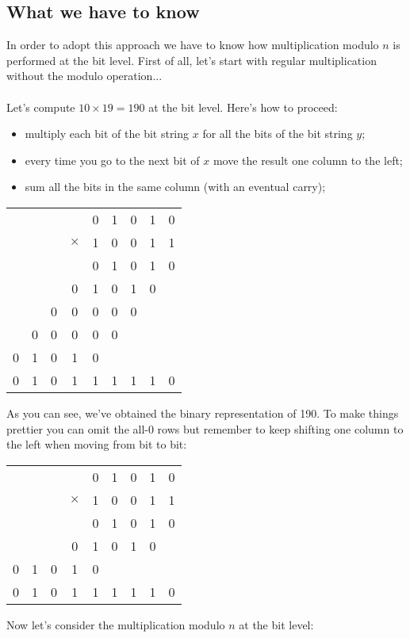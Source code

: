 \subsection{What we have to know}
In order to adopt this approach we have to know how multiplication modulo $n$ is performed at the bit level. First of all, let's start with regular multiplication without the modulo operation...\\\\
Let's compute $10\times19=190$ at the bit level. Here's how to proceed:
\begin{itemize}
    \item multiply each bit of the bit string $x$ for all the bits of the bit string $y$;
    \item every time you go to the next bit of $x$ move the result one column to the left;
    \item sum all the bits in the same column (with an eventual carry);
\end{itemize}
\begin{center}
    \begin{tabular}{ccccccccc}
        &&&&0&1&0&1&0\\
        &&&$\times$&1&0&0&1&1\\
        \hline
        &&&&0&1&0&1&0\\
        &&&0&1&0&1&0&\\
        &&0&0&0&0&0&&\\
        &0&0&0&0&0&&&\\
        0&1&0&1&0&&&&\\
        \hline
        0&1&0&1&1&1&1&1&0
    \end{tabular}
\end{center}
As you can see, we've obtained the binary representation of 190. To make things prettier you can omit the all-0 rows but remember to keep shifting one column to the left when moving from bit to bit:
\begin{center}
    \begin{tabular}{ccccccccc}
        &&&&0&1&0&1&0\\
        &&&$\times$&1&0&0&1&1\\
        \hline
        &&&&0&1&0&1&0\\
        &&&0&1&0&1&0&\\
        0&1&0&1&0&&&&\\
        \hline
        0&1&0&1&1&1&1&1&0
    \end{tabular}
\end{center}
Now let's consider the multiplication modulo $n$ at the bit level:
